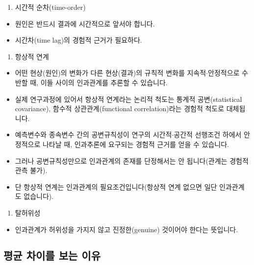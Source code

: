 \documentclass[]{book}
\providecommand{\tightlist}{%
  \setlength{\itemsep}{0pt}\setlength{\parskip}{0pt}}
\begin{document}
\begin{enumerate}
\def\labelenumi{\arabic{enumi}.}
\tightlist
\item
  시간적 순차(time-order)
\end{enumerate}

\begin{itemize}
\tightlist
\item
  원인은 반드시 결과에 시간적으로 앞서야 합니다.
\item
  시간차(time lag)의 경험적 근거가 필요하다.
\end{itemize}

\begin{enumerate}
\def\labelenumi{\arabic{enumi}.}
\setcounter{enumi}{1}
\tightlist
\item
  항상적 연계
\end{enumerate}

\begin{itemize}
\tightlist
\item
  어떤 현상(원인)의 변화가 다른 현상(결과)의 규칙적 변화를 지속적\(\cdot\)안정적으로
  수반할 때, 이들 사이의 인과관계를 추론할 수 있습니다.
\item
  실제 연구과정에 있어서 항상적 연계라는 논리적 척도는 통계적 공변(statistical covariance), 함수적 상관관계(functional correlation)라는 경험적 척도로 대체됩니다.
\item
  예측변수와 종속변수 간의 공변규칙성이 연구의 시간적\(\cdot\)공간적 선행조건 하에서
  안정적으로 나타날 때, 인과추론에 요구되는 경험적 근거를 얻을 수 있습니다.
\item
  그러나 공변규칙성만으로 인과관계의 존재를 단정해서는 안 됩니다(관계는 경험적 관측 불가).
\item
  단 항상적 연계는 인과관계의 필요조건입니다(항상적 연계 없으면 일단 인과관계도 없습니다).
\end{itemize}

\begin{enumerate}
\def\labelenumi{\arabic{enumi}.}
\setcounter{enumi}{2}
\tightlist
\item
  탈허위성
\end{enumerate}

\begin{itemize}
\tightlist
\item
  인과관계가 허위성을 가지지 않고 진정한(genuine) 것이어야 한다는 뜻입니다.
\end{itemize}

\hypertarget{uxd3c9uxade0-uxcc28uxc774uxb97c-uxbcf4uxb294-uxc774uxc720}{%
\subsection{평균 차이를 보는 이유}\label{uxd3c9uxade0-uxcc28uxc774uxb97c-uxbcf4uxb294-uxc774uxc720}}
\end{document}
